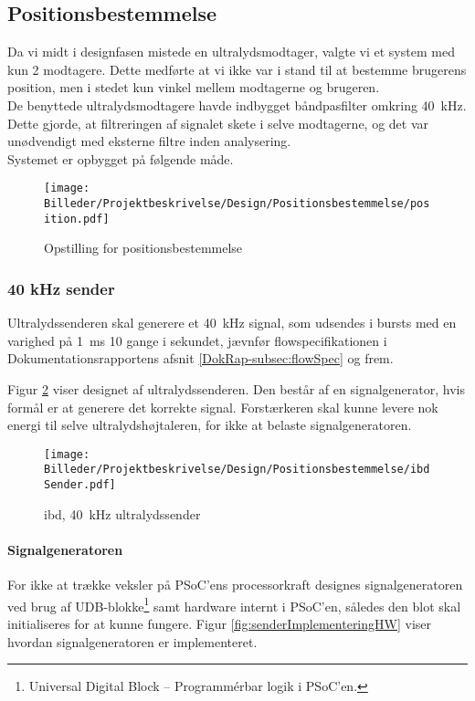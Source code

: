 \subsection{Positionsbestemmelse}

Da vi midt i designfasen mistede en ultralydsmodtager, valgte vi et system med kun 2 modtagere. Dette medførte at vi ikke var i stand til at bestemme brugerens position, men i stedet kun vinkel mellem modtagerne og brugeren.\\
De benyttede ultralydsmodtagere havde indbygget båndpasfilter omkring \SI{40}{kHz}. Dette gjorde, at filtreringen af signalet skete i selve modtagerne, og det var unødvendigt med eksterne filtre inden analysering.\\
Systemet er opbygget på følgende måde.

\begin{figure}[H]
\centering
\texttt{[image: Billeder/Projektbeskrivelse/Design/Positionsbestemmelse/position.pdf]}\medskip
\caption{Opstilling for positionsbestemmelse}
\label{fig:opstillingPosBes}
\end{figure}



\subsubsection*{40 kHz sender}
Ultralydssenderen skal generere et \SI{40}{kHz} signal, som udsendes i bursts med en varighed på \SI{1}{ms} 10 gange i sekundet, jævnfør flowspecifikationen i Dokumentationsrapportens afsnit \vref{DokRap-subsec:flowSpec} og frem.

Figur \ref{fig:ultralydsSender} viser designet af ultralydssenderen. Den består af en signalgenerator, hvis formål er at generere det korrekte signal. Forstærkeren skal kunne levere nok energi til selve ultralydshøjtaleren, for ikke at belaste signalgeneratoren.

\begin{figure}[htb]
	\centering
	\texttt{[image: Billeder/Projektbeskrivelse/Design/Positionsbestemmelse/ibd Sender.pdf]}
	\caption{ibd, \SI{40}{kHz} ultralydssender}
	\label{fig:ultralydsSender}
\end{figure}

\paragraph{Signalgeneratoren} For ikke at trække veksler på PSoC'ens processorkraft designes signalgeneratoren ved brug af UDB-blokke\footnote{Universal Digital Block -- Programmérbar logik i PSoC'en.} samt hardware internt i PSoC'en, således den blot skal initialiseres for at kunne fungere. Figur \ref{fig:senderImplementeringHW} viser hvordan signalgeneratoren er implementeret.

